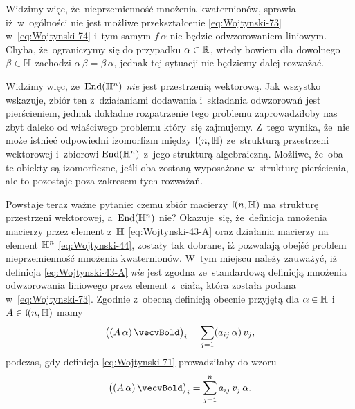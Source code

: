 \documentclass[a4paper,11pt]{article}
\numberwithin{equation}{section}
\begin{document}
Widzimy więc, że~nieprzemienność mnożenia kwaternionów, sprawia
iż~w~ogólności nie jest możliwe przekształcenie \eqref{eq:Wojtynski-73}
w~\eqref{eq:Wojtynski-74} i~tym samym $f \, \alpha$ nie będzie odwzorowaniem
liniowym. Chyba, że~ograniczymy się do przypadku $\alpha \in \mathbb{R}$, wtedy bowiem
dla dowolnego $\beta \in \mathbb{H}$ zachodzi $\alpha \, \beta = \beta \, \alpha$, jednak tej sytuacji
nie będziemy dalej rozważać.

Widzimy więc, że~$\mathrm{End}( \mathbb{H}^{ n } )$ \textit{nie} jest przestrzenią
wektorową. Jak wszystko wskazuje, zbiór ten z~działaniami dodawania
i~składania odwzorowań jest pierścieniem, jednak dokładne rozpatrzenie tego
problemu zaprowadziłoby nas zbyt daleko od właściwego problemu który~się
zajmujemy. Z~tego wynika, że~nie może istnieć odpowiedni izomorfizm między
$\mathfrak{l}( n, \mathbb{H} )$ ze~strukturą przestrzeni wektorowej
i~zbiorowi $\mathrm{End}( \mathbb{H}^{ n } )$ z~jego strukturą algebraiczną. Możliwe,
że~oba te obiekty są izomorficzne, jeśli oba zostaną wyposażone w~strukturę
pierścienia, ale to pozostaje poza zakresem tych rozważań.

Powstaje teraz ważne pytanie: czemu zbiór macierzy $\mathfrak{l}( n, \mathbb{H} )$ ma
strukturę przestrzeni wektorowej, a~$\mathrm{End}( \mathbb{H}^{ n } )$ nie? Okazuje~się,
że~definicja mnożenia macierzy przez element z~$\mathbb{H}$
\eqref{eq:Wojtynski-43-A} oraz działania macierzy na element $\mathbb{H}^{ n }$
\eqref{eq:Wojtynski-44}, zostały tak dobrane, iż pozwalają obejść problem
nieprzemienność mnożenia kwaternionów. W~tym miejscu należy zauważyć, iż
definicja \eqref{eq:Wojtynski-43-A} \textit{nie} jest zgodna ze~standardową
definicją mnożenia odwzorowania liniowego przez element z~ciała, która
została podana w~\eqref{eq:Wojtynski-73}. Zgodnie z~obecną definicją
obecnie przyjętą dla $\alpha \in \mathbb{H}$ i~$A \in \mathfrak{l}( n, \mathbb{H} )$ mamy
\begin{equation}
  \label{eq:Wojtynski-78}
  \big( ( A \, \alpha ) \, \vecvBold \big)_{ i } =
  \sum_{ j = 1 } ( a_{ i j } \, \alpha ) \, v_{ j },
\end{equation}
podczas, gdy definicja \eqref{eq:Wojtynski-71} prowadziłaby do wzoru
\begin{equation}
  \label{eq:Wojtynsk-79}
  \big( ( A \, \alpha ) \, \vecvBold \big)_{ i } =
  \sum_{ j = 1 }^{ n } a_{ i j } \, v_{ j } \, \alpha.
\end{equation}
\end{document}
